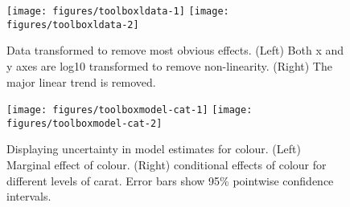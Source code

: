 \begin{figure}
\texttt{[image: figures/toolboxldata-1]} \texttt{[image: figures/toolboxldata-2]} \caption{Data transformed to remove most obvious effects. (Left) Both x and y axes are log10 transformed to remove non-linearity. (Right) The major linear trend is removed.\label{fig:ldata}}
\end{figure}

\begin{Shaded}
\end{Shaded}

\begin{figure}
\texttt{[image: figures/toolboxmodel-cat-1]} \texttt{[image: figures/toolboxmodel-cat-2]} \caption{Displaying uncertainty in model estimates for colour. (Left) Marginal effect of colour. (Right) conditional effects of colour for different levels of carat. Error bars show 95\% pointwise confidence intervals.\label{fig:model-cat}}
\end{figure}

